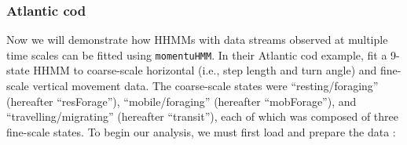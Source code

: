 \documentclass[12pt]{article}\usepackage[]{graphicx}\usepackage[]{xcolor}
\begin{document}
\subsubsection{Atlantic cod}
\label{sec:atlanticCod}
Now we will demonstrate how HHMMs with data streams observed at multiple time scales can be fitted using \verb|momentuHMM|. In their Atlantic cod example, \cite{AdamEtAl2019} fit a 9-state HHMM to coarse-scale horizontal (i.e., step length and turn angle) and fine-scale vertical movement data. The coarse-scale states were ``resting/foraging'' (hereafter ``resForage''), ``mobile/foraging'' (hereafter ``mobForage''), and ``travelling/migrating'' (hereafter ``transit''), each of which was composed of three fine-scale states. To begin our analysis, we must first load and prepare the data \citep[available for download from][]{AdamEtAl2019}:
\end{document}

